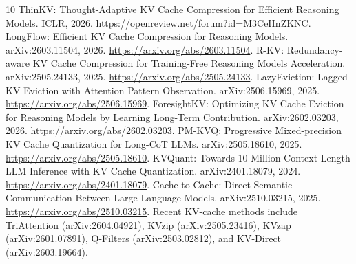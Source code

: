 \documentclass{article}
\begin{document}
\begin{thebibliography}{10}
ThinKV: Thought-Adaptive KV Cache Compression for Efficient Reasoning Models.
ICLR, 2026. \url{https://openreview.net/forum?id=M3CeHnZKNC}.
LongFlow: Efficient KV Cache Compression for Reasoning Models.
arXiv:2603.11504, 2026. \url{https://arxiv.org/abs/2603.11504}.
R-KV: Redundancy-aware KV Cache Compression for Training-Free Reasoning Models
Acceleration. arXiv:2505.24133, 2025. \url{https://arxiv.org/abs/2505.24133}.
LazyEviction: Lagged KV Eviction with Attention Pattern Observation.
arXiv:2506.15969, 2025. \url{https://arxiv.org/abs/2506.15969}.
ForesightKV: Optimizing KV Cache Eviction for Reasoning Models by Learning
Long-Term Contribution. arXiv:2602.03203, 2026. \url{https://arxiv.org/abs/2602.03203}.
PM-KVQ: Progressive Mixed-precision KV Cache Quantization for Long-CoT LLMs.
arXiv:2505.18610, 2025. \url{https://arxiv.org/abs/2505.18610}.
KVQuant: Towards 10 Million Context Length LLM Inference with KV Cache
Quantization. arXiv:2401.18079, 2024. \url{https://arxiv.org/abs/2401.18079}.
Cache-to-Cache: Direct Semantic Communication Between Large Language Models.
arXiv:2510.03215, 2025. \url{https://arxiv.org/abs/2510.03215}.
Recent KV-cache methods include TriAttention (arXiv:2604.04921), KVzip
(arXiv:2505.23416), KVzap (arXiv:2601.07891), Q-Filters (arXiv:2503.02812),
and KV-Direct (arXiv:2603.19664).
\end{thebibliography}
\end{document}
